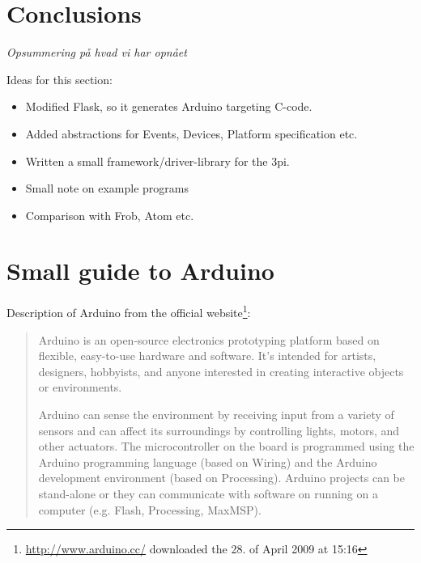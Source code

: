 \documentclass[a4paper, oneside, final]{memoir}
\begin{document}
\chapter{Conclusions}
\textit{Opsummering på hvad vi har opnået}

Ideas for this section:
\begin{itemize}
\item Modified Flask, so it generates Arduino targeting C-code.
\item Added abstractions for Events, Devices, Platform specification etc.
\item Written a small framework/driver-library for the 3pi.
\item Small note on example programs
\item Comparison with Frob, Atom etc.
\end{itemize}





\appendix

\chapter{Small guide to Arduino}


Description of Arduino from the official
website\footnote{\url{http://www.arduino.cc/} downloaded the 28. of April 2009 at 15:16}:
\begin{quotation}
  Arduino is an open-source electronics prototyping platform based on
  flexible, easy-to-use hardware and software. It's intended for
  artists, designers, hobbyists, and anyone interested in creating
  interactive objects or environments.

  Arduino can sense the environment by receiving input from a variety
  of sensors and can affect its surroundings by controlling lights,
  motors, and other actuators. The microcontroller on the board is
  programmed using the Arduino programming language (based on Wiring)
  and the Arduino development environment (based on
  Processing). Arduino projects can be stand-alone or they can
  communicate with software on running on a computer (e.g. Flash,
  Processing, MaxMSP).
\end{quotation}
\end{document}
